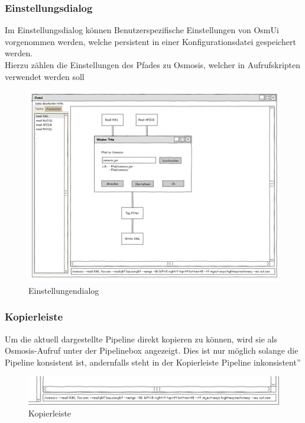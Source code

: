 \documentclass[a4paper,12pt]{scrartcl}
\begin{document}
\subsubsection{Einstellungsdialog}
Im Einstellungsdialog können Benutzerspezifische Einstellungen von OsmUi vorgenommen werden, welche persistent in einer Konfigurationsdatei gespeichert werden.\\
Hierzu zählen die Einstellungen des Pfades zu Osmosis, welcher in Aufrufskripten verwendet werden soll\\
\begin{center}
\begin{figure}[h!]
\begin{center}
\includegraphics[width=15cm]{ui_prototype/OsmUi_Einstellungen.png}
\caption{Einstellungendialog}
\end{center}
\end{figure}
\end{center}


\subsubsection{Kopierleiste}
Um die aktuell dargestellte Pipeline direkt kopieren zu können, wird sie als Osmosis-Aufruf unter der Pipelinebox angezeigt. Dies ist nur möglich
solange die Pipeline konsistent ist, andernfalls steht in der Kopierleiste \glqq Pipeline inkonsistent''
\begin{center}
\begin{figure}[h!]
\begin{center}
\includegraphics[width=15cm]{ui_prototype/OsmUi_Leisteklein.png}
\caption{Kopierleiste}
\end{center}
\end{figure}
\end{center}
\end{document}
